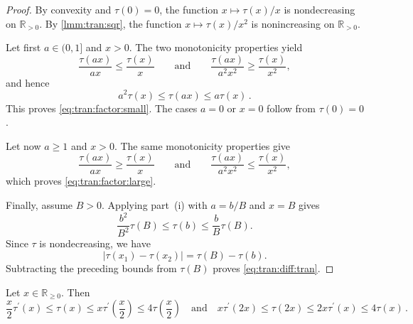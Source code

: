 \documentclass{article}
\newcommand{\R}{\mathbb{R}}
\newcommand{\Rp}{\R_{\geq0}}
\newcommand{\Rpp}{\R_{>0}}
\newcommand{\lb}{\left(} %
\newcommand{\rb}{\right)} %
\newcommand{\br}[1]{\lb #1 \rb} %
\newcommand{\brOf}[1]{\!\br{#1}} %
\newcommand{\absof}[1]{\vert #1 \vert} %
\newcommand{\pr}{^\prime}
\newcommand{\eqfs}{\,.}
\newcommand{\tran}{\tau}
\newcommand{\dtran}{\tau\pr}
\begin{document}
\begin{proof}
    By convexity and $\tran(0)=0$, the function
    $x\mapsto\tran(x)/x$ is nondecreasing on $\Rpp$. By
    \cref{lmm:tran:sqr}, the function
    $x\mapsto\tran(x)/x^2$ is nonincreasing on $\Rpp$.
    
    Let first $a\in(0,1]$ and $x>0$. The two monotonicity properties
    yield
    \begin{equation}
        \frac{\tran(ax)}{ax}
        \leq
        \frac{\tran(x)}x
        \qquad\text{and}\qquad
        \frac{\tran(ax)}{a^2x^2}
        \geq
        \frac{\tran(x)}{x^2},
    \end{equation}
    and hence
    \begin{equation}
        a^2\tran(x)
        \leq
        \tran(ax)
        \leq
        a\tran(x)
        \eqfs
    \end{equation}
    This proves \eqref{eq:tran:factor:small}. The cases $a=0$ or
    $x=0$ follow from $\tran(0)=0$.
    
    Let now $a\geq1$ and $x>0$. The same monotonicity properties give
    \begin{equation}
        \frac{\tran(ax)}{ax}
        \geq
        \frac{\tran(x)}x
        \qquad\text{and}\qquad
        \frac{\tran(ax)}{a^2x^2}
        \leq
        \frac{\tran(x)}{x^2},
    \end{equation}
    which proves \eqref{eq:tran:factor:large}.
    
    Finally, assume $B>0$. Applying part~\textup{(i)} with $a=b/B$ and $x=B$ gives
    \begin{equation}
        \frac{b^2}{B^2}\tran(B)
        \leq
        \tran(b)
        \leq
        \frac{b}{B}\tran(B).
    \end{equation}
    Since $\tran$ is nondecreasing, we have
    \begin{equation}
        \absof{\tran(x_1)-\tran(x_2)}
        =
        \tran(B)-\tran(b).
    \end{equation}
    Subtracting the preceding bounds from $\tran(B)$ proves
    \eqref{eq:tran:diff:tran}.
\end{proof}
%
\begin{lemma}\label{lmm:tran:tran}
	Let $x \in \Rp$. Then
	\begin{equation}
		\frac x2 \dtran(x)
		\leq
		\tran(x)
		\leq 
		x\dtran\brOf{\frac{x}2}
		\leq 
		4\tran\brOf{\frac{x}2}
	\quad\text{and}\quad
		x \dtran(2x)
		\leq
		\tran(2x)
		\leq 
		2x\dtran\brOf{x}
		\leq 
		4\tran\brOf{x}
		\eqfs
	\end{equation}
\end{lemma}
\end{document}
